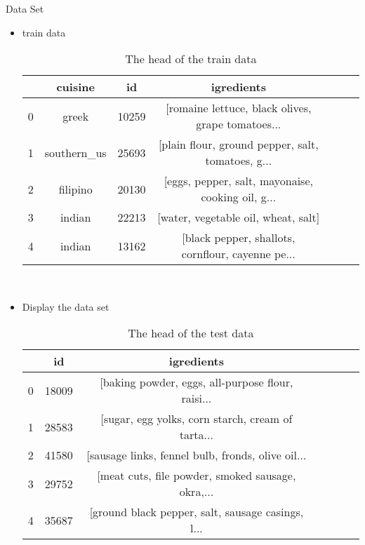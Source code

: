 \documentclass[
 size=12pt,
 paper=smartboard, %
 mode=present, %
 display=slides, %
style=tuliplab,
pauseslide,
fleqn,leqno]{powerdot}
\begin{document}
  \begin{slide}{Data Set}
  \begin{itemize}
    \item train data
    \begin{table}[htbp]  \centering
      \caption{The head of the train data}
      \label{tbl:data information}
      \begin{tabular}{ccccccc}
        \hline
        & cuisine & id & igredients\\
        \hline
        0 & greek       & 10259 & [romaine lettuce, black olives, grape tomatoes... \\
        1 & southern_us & 25693 & [plain flour, ground pepper, salt, tomatoes, g... \\
        2 & filipino    & 20130 & [eggs, pepper, salt, mayonaise, cooking oil, g... \\
        3 & indian      & 22213 & [water, vegetable oil, wheat, salt] \\
        4 & indian      & 13162 & [black pepper, shallots, cornflour, cayenne pe... \\
        \hline 
      \end{tabular}
    \end{table}
    \

  \item Display the data set 
  \begin{table}[htbp]  \centering
    \caption{The head of the test data}
    \label{tbl:data information}
    \begin{tabular}{ccccccc}
      & id & igredients\\
      \hline
      0  & 18009 & [baking powder, eggs, all-purpose flour, raisi... \\
      1  & 28583 & [sugar, egg yolks, corn starch, cream of tarta... \\
      2  & 41580 & [sausage links, fennel bulb, fronds, olive oil... \\
      3  & 29752 & [meat cuts, file powder, smoked sausage, okra,... \\
      4  & 35687 & [ground black pepper, salt, sausage casings, l... \\
      \hline 
    \end{tabular}
  \end{table}
  \end{itemize}
\end{slide}
\end{document}
